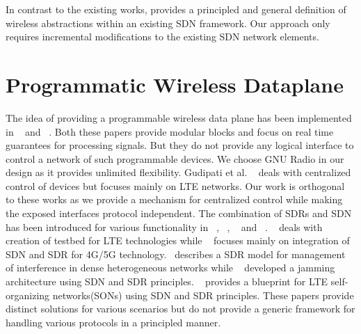 In contrast to the existing works, \aetherflow  provides a principled and general definition of wireless abstractions within an existing SDN framework. Our approach only requires incremental modifications to the existing SDN network elements.

\section{Programmatic Wireless Dataplane} 

The idea of providing a programmable wireless data plane has been implemented in ~\cite{openradio} and ~\cite{atomix}. Both these papers provide modular blocks and focus on real time guarantees for processing signals. But they do not provide any logical interface to control a network of such programmable devices. We choose GNU Radio in our design as it provides unlimited flexibility. Gudipati et al. ~\cite{softran} deals with centralized control of devices but focuses mainly on LTE networks. Our work is orthogonal to these works as we provide a mechanism for centralized control while making the exposed interfaces protocol independent.
The combination of SDRs and SDN has been introduced for various functionality in ~\cite{cho2014integration, sun2015integrating}, ~\cite{mancuso2014prototyping}, ~\cite{corbett2014countering} and ~\cite{sdnsdrinsno}. ~\cite{mancuso2014prototyping} deals with creation of testbed for LTE technologies while ~\cite{cho2014integration, sun2015integrating} focuses mainly on integration of SDN and SDR for 4G/5G technology.~\cite{gupta2015labview} describes a SDR model for management of interference in dense heterogeneous networks while ~\cite{corbett2014countering} developed a jamming architecture using SDN and SDR principles. ~\cite{sdnsdrinsno} provides a blueprint for LTE self-organizing networks(SONs) using SDN and SDR principles. These papers provide distinct solutions for various scenarios but do not provide a generic framework for handling various protocols in a principled manner.
